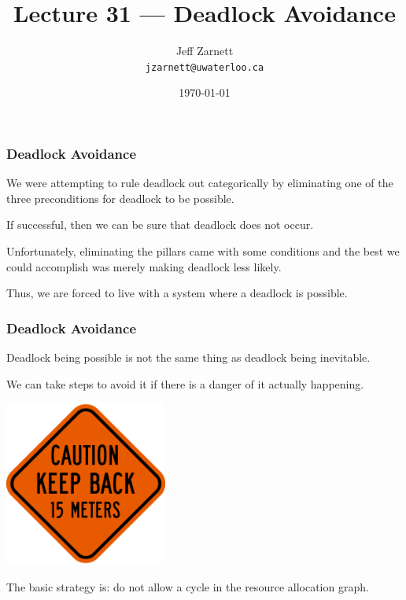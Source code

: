 

\title{Lecture 31 --- Deadlock Avoidance }

\author{Jeff Zarnett \\ \small \texttt{jzarnett@uwaterloo.ca}}
\date{\today}




\begin{frame}
	\titlepage

\end{frame}

\begin{frame}
	\frametitle{Deadlock Avoidance}

	We were attempting to rule deadlock out categorically by eliminating one of the three preconditions for deadlock to be possible.

	If successful, then we can be sure that deadlock does not occur.

	Unfortunately, eliminating the pillars came with some conditions and the best we could accomplish was merely making deadlock less likely.

	Thus, we are forced to live with a system where a deadlock is possible.
\end{frame}


\begin{frame}
	\frametitle{Deadlock Avoidance}

	Deadlock being possible is not the same thing as deadlock being inevitable.

	We can take steps to avoid it if there is a danger of it actually happening.

	\begin{center}
		\includegraphics[width=0.4\textwidth]{images/keepback.png}
	\end{center}

	The basic strategy is: do not allow a cycle in the resource allocation graph.


\end{frame}

